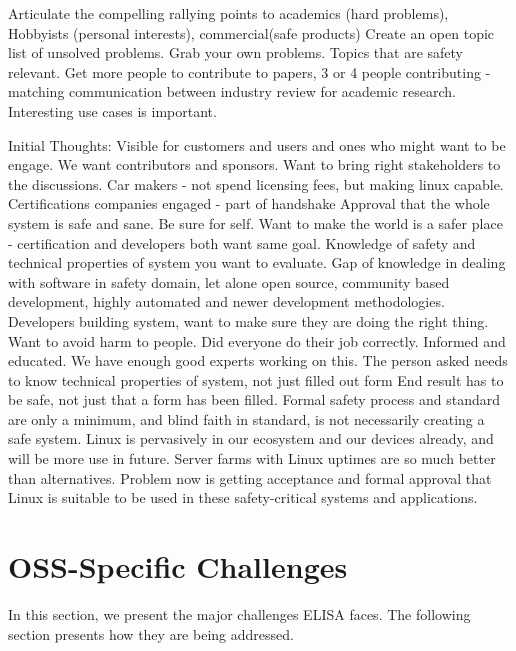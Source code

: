 \documentclass[12pt]{ElisaPaper}
\begin{document}
Articulate the compelling rallying points to 
academics (hard problems), 
Hobbyists (personal interests),
commercial(safe products)    
Create an open topic list of unsolved problems.  
Grab your own problems.   
 Topics that are safety relevant.    
 Get more people to contribute to papers,  3 or 4 people contributing - matching communication between industry review for academic research. 
Interesting use cases is important. 



Initial Thoughts:
Visible for customers and users and ones who might want to be engage.
We want contributors and sponsors.
Want to bring right stakeholders to the discussions.
Car makers - not spend licensing fees, but making linux capable.
Certifications companies engaged - part of handshake
Approval that the whole system is safe and sane.
Be sure for self. 
Want to make the world is a safer place - certification and developers both want same goal.
Knowledge of safety and technical properties of system you want to evaluate.
Gap of knowledge in dealing with software in safety domain,  let alone open source, community based development,  highly automated and newer development methodologies.
Developers building system, want to make sure they are doing the right thing.
Want to avoid harm to people.
Did everyone do their job correctly.
Informed and educated.
We have enough good experts working on this.    
The person asked needs to know technical properties of system,  not just filled out form
End result has to be safe,  not just that a form has been filled.
Formal safety process and standard are only a minimum,  and blind faith in standard, is not necessarily creating a safe system.
Linux is pervasively in our ecosystem and our devices already,  and will be more use in future.
Server farms with Linux uptimes are so much better than alternatives.   
Problem now is getting acceptance and formal approval that Linux is suitable to be used in these safety-critical systems and applications.  



\section{OSS-Specific Challenges}
\label{sec:OSS specific Challenges}
In this section, we present the major challenges ELISA faces.
The following section presents how they are being addressed.
\end{document}
